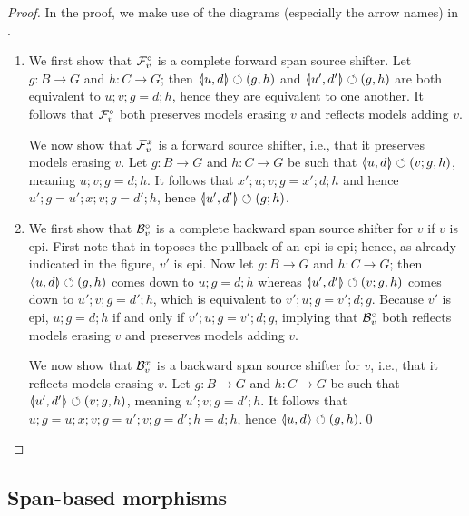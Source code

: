 \begin{proof}
In the proof, we make use of the diagrams (especially the arrow names) in .
\begin{enumerate}
\item We first show that $\mathcal{F}_v^\circ$ is a complete forward span source shifter. Let $g:B\to G$ and $h:C\to G$; then $\spanof{u}{d}\commutes (g,h)$ and $\spanof{u'}{d'}\commutes (g,h)$ are both equivalent to $u;v;g=d;h$, hence they are equivalent to one another. It follows that $\mathcal{F}_v^\circ$ both  preserves models erasing $v$ and reflects models adding $v$.

We now show that $\mathcal{F}_v^x$ is a forward source shifter, i.e., that it preserves models erasing $v$. Let $g:B\to G$ and $h:C\to G$ be such that $\spanof{u}{d}\commutes (v;g,h)$, meaning $u;v;g=d;h$. It follows that $x';u;v;g=x';d;h$ and hence $u';g=u';x;v;g=d';h$, hence $\spanof{u'}{d'}\commutes (g;h)$.

\item We first show that $\mathcal{B}_v^\circ$ is a complete backward span source shifter for $v$ if $v$ is epi. First note that in toposes the pullback of an epi is epi; hence, as already indicated in the figure, $v'$ is epi. Now let $g:B\to G$ and $h:C\to G$; then $\spanof{u}{d}\commutes (g,h)$ comes down to $u;g=d;h$ whereas $\spanof{u'}{d'}\commutes (v;g,h)$ comes down to $u';v;g=d';h$, which is equivalent to $v';u;g=v';d;g$. Because $v'$ is epi, $u;g=d;h$ if and only if $v';u;g=v';d;g$, implying that $\mathcal{B}_v^\circ$ both reflects models erasing $v$ and preserves models adding $v$.

We now show that $\mathcal{B}_v^x$ is a backward span source shifter for $v$, i.e., that it reflects models erasing $v$. Let $g:B\to G$ and $h:C\to G$ be such that $\spanof{u'}{d'}\commutes (v;g,h)$, meaning $u';v;g=d';h$. It follows that $u;g=u;x;v;g=u';v;g=d';h=d;h$, hence $\spanof u d\commutes (g,h)$.\qed
\end{enumerate}
\end{proof}

\subsection{Span-based morphisms}

